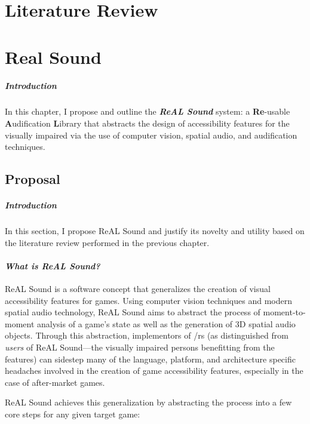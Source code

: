 \documentclass{report}
\newcommand{\rs}{ReAL Sound\xspace}
\begin{document}
\chapter{Literature Review} 


\chapter{Real Sound}
\paragraph{Introduction}
In this chapter, I propose and outline the \textbf{\emph{\rs}} system: a \textbf{Re}-usable \textbf{A}udification \textbf{L}ibrary that abstracts the design of accessibility features for the visually impaired via the use of computer vision, spatial audio, and audification techniques.

\section{Proposal} 
\paragraph{Introduction} 

In this section, I propose \rs and justify its novelty and utility based on the literature review performed in the previous chapter.

\subsubsection{\emph{What is \rs?}}
\rs is a software concept that generalizes the creation of visual accessibility features for games. Using computer vision techniques and modern spatial audio technology, \rs aims to abstract the process of moment-to-moment analysis of a game's state as well as the generation of 3D spatial audio objects. Through this abstraction, implementors of /rs (as distinguished from \emph{users} of \rs---the visually impaired persons benefitting from the features) can sidestep many of the language, platform, and architecture specific headaches involved in the creation of game accessibility features, especially in the case of after-market games. 

\rs achieves this generalization by abstracting the process into a few core steps for any given target game:
\end{document}
